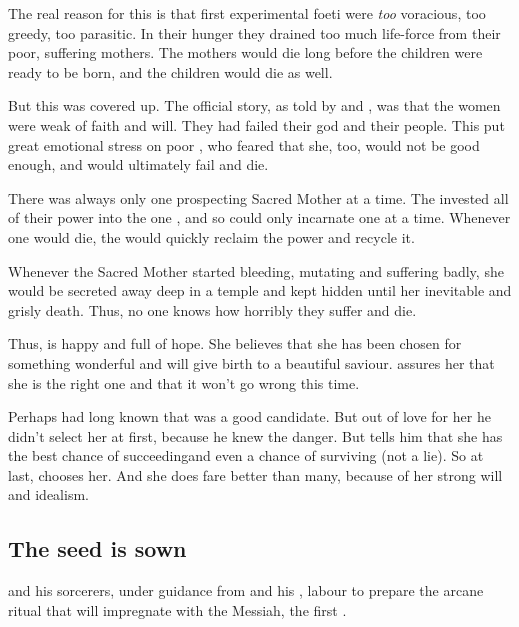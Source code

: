 The real reason for this is that first experimental \resphan{} foeti were \emph{too} voracious, too greedy, too parasitic. In their hunger they drained too much life-force from their poor, suffering mothers. The mothers would die long before the children were ready to be born, and the children would die as well.

But this was covered up. The official story, as told by \Semiza{} and \Eshayzal, was that the women were weak of faith and will. They had failed their god and their people. This put great emotional stress on poor \Ilu, who feared that she, too, would not be good enough, and would ultimately fail and die. 

There was always only one prospecting Sacred Mother at a time. The \banelords{} invested all of their \resphan{} power into the one \banemessiah, and so could only incarnate one at a time. Whenever one would die, the \banes{} would quickly reclaim the power and recycle it. 

Whenever the Sacred Mother started bleeding, mutating and suffering badly, she would be secreted away deep in a temple and kept hidden until her inevitable and grisly death. Thus, no one knows how horribly they suffer and die. 

Thus, \Ilu{} is happy and full of hope. She believes that she has been chosen for something wonderful and will give birth to a beautiful saviour. \Semiza{} assures her that she is the right one and that it won't go wrong this time. 

Perhaps \Semiza{} had long known that \Ilu{} was a good candidate. But out of love for her he didn't select her at first, because he knew the danger. But \Daggerrain{} tells him that she has the best chance of succeeding\dash and even a chance of surviving (not a lie). So at last, \Semiza{} chooses her. And she does fare better than many, because of her strong will and idealism. 









\subsection{The seed is sown}
\Semiza{} and his sorcerers, under guidance from \Daggerrain{} and his \banelords, labour to prepare the arcane ritual that will impregnate \Ilu{} with the Messiah, the first \resphan. 

